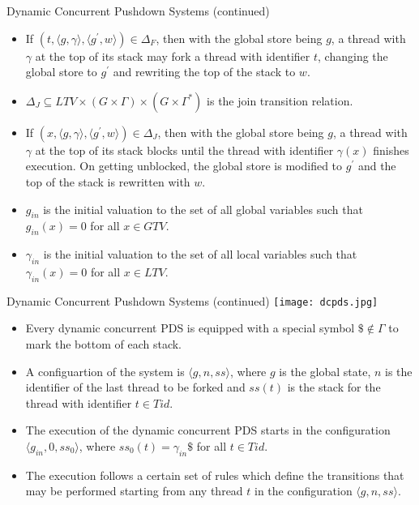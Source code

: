 \documentclass[10pt,notheorems]{beamer}
\theoremstyle{plain} %
\begin{document}
\begin{frame}{Dynamic Concurrent Pushdown Systems (continued)}
    \begin{itemize}
        \item If $(t,\langle g,\gamma\rangle,\langle g^{\prime},w\rangle)\in \Delta_F$, then with the global store 
        being $g$, a thread with $\gamma$ at the top of its stack may fork a thread with identifier $t$, changing the global 
        store to $g^{\prime}$ and rewriting the top of the stack to $w$.
        \item $\Delta_J\subseteq LTV\times (G\times\Gamma)\times(G\times\Gamma^*)$ is the join transition relation.
        \item If $(x,\langle g,\gamma\rangle,\langle g^{\prime},w\rangle)\in \Delta_J$, then with the global store being $g$,
        a thread with $\gamma$ at the top of its stack blocks until the thread with identifier $\gamma(x)$ 
        finishes execution. On getting unblocked, the global store is modified to $g^{\prime}$ and the top
        of the stack is rewritten with $w$.
        \item $g_{in}$ is the initial valuation to the set of all global variables such that 
        $g_{in}(x)=0$ for all $x\in GTV$. 
        \item $\gamma_{in}$ is the initial valuation to the set of all local variables such that 
        $\gamma_{in}(x)=0$ for all $x\in LTV$. 
    \end{itemize}
\end{frame}
\begin{frame}{Dynamic Concurrent Pushdown Systems (continued)}
    \texttt{[image: dcpds.jpg]}
    \begin{itemize}
        \item Every dynamic concurrent PDS is equipped with a special symbol $\$\not\in\Gamma$ to mark the bottom of each stack.
        \item A configuartion of the system is $\langle g,n,ss\rangle$, where $g$ is the global state, 
        $n$ is the identifier of the last thread to be forked and $ss(t)$ is the stack for the thread 
        with identifier $t\in Tid$. 
        \item The execution of the dynamic concurrent PDS starts in the configuration $\langle g_{in},0,ss_0\rangle$,
        where $ss_0(t)=\gamma_{in}\$$ for all $t\in Tid$.    
        \item The execution follows a certain set of rules which define the transitions that may be performed
        starting from any thread $t$ in the configuration $\langle g,n,ss\rangle$. 
    \end{itemize}
\end{frame}
\end{document}
